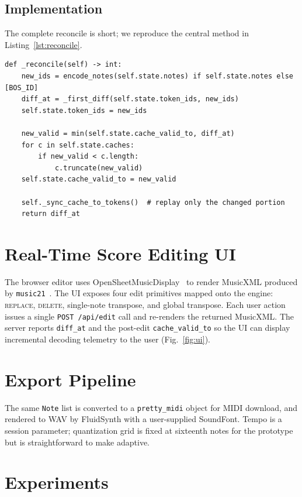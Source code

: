 \documentclass[11pt,a4paper]{article}
\begin{document}
\subsection{Implementation}

The complete reconcile is short; we reproduce the central method in
Listing~\ref{lst:reconcile}.

\begin{lstlisting}[caption={Edit reconciliation (\texttt{src/edit\_engine.py}).},label={lst:reconcile}]
def _reconcile(self) -> int:
    new_ids = encode_notes(self.state.notes) if self.state.notes else [BOS_ID]
    diff_at = _first_diff(self.state.token_ids, new_ids)
    self.state.token_ids = new_ids

    new_valid = min(self.state.cache_valid_to, diff_at)
    for c in self.state.caches:
        if new_valid < c.length:
            c.truncate(new_valid)
    self.state.cache_valid_to = new_valid

    self._sync_cache_to_tokens()  # replay only the changed portion
    return diff_at
\end{lstlisting}

\section{Real-Time Score Editing UI}

The browser editor uses OpenSheetMusicDisplay~\cite{osmd} to render
MusicXML produced by \texttt{music21}~\cite{cuthbert2010music21}. The UI
exposes four edit primitives mapped onto the engine:
\textsc{replace}, \textsc{delete}, single-note transpose, and global
transpose. Each user action issues a single \texttt{POST /api/edit} call
and re-renders the returned MusicXML. The server reports
\texttt{diff\_at} and the post-edit \texttt{cache\_valid\_to} so the UI
can display incremental decoding telemetry to the user (Fig.~\ref{fig:ui}).

\section{Export Pipeline}\label{sec:export}

The same \texttt{Note} list is converted to a \texttt{pretty\_midi}
object for MIDI download, and rendered to WAV by FluidSynth
\cite{fluidsynth} with a user-supplied SoundFont. Tempo is a session
parameter; quantization grid is fixed at sixteenth notes for the
prototype but is straightforward to make adaptive.

\section{Experiments}
\end{document}
